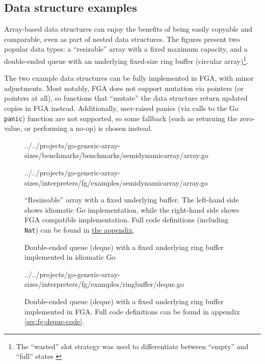 \subsection{Data structure examples}

Array-based data structures can enjoy the benefits of being easily copyable and
comparable, even as part of nested data structures. The figures present two
popular data types: a ``resizable'' array with a fixed maximum capacity, and a
double-ended queue with an underlying fixed-size ring buffer (circular
array)\footnote{The ``wasted'' slot strategy was used to differentiate between
	``empty'' and ``full'' states \autocite{ringBuffer}}.

The two example data structures can be fully implemented in FGA, with minor
adjustments. Most notably, FGA does not support mutation via pointers (or
pointers at all), so functions that ``mutate'' the data structure return updated
copies in FGA instead. Additionally, user-raised panics (via calls to the Go
\texttt{panic}) function are not supported, so some fallback (such as
returning the zero-value, or performing a no-op) is chosen instead.

\begin{figure}
	\noindent\begin{minipage}[t]{.45\linewidth}
		
		{../../projects/go-generic-array-sizes/benchmarks/benchmarks/semidynamicarray/array.go}
	\end{minipage}
	\hfill
	\noindent\begin{minipage}[t]{.45\linewidth}
		
		{../../projects/go-generic-array-sizes/interpreters/fg/examples/semidynamicarray/array.go}
	\end{minipage}
	\caption{ ``Resizeable'' array with a fixed underlying buffer. The left-hand side
		shows idiomatic Go implementation, while the right-hand side shows FGA
		compatible implementation. Full code definitions (including
		\texttt{Nat}) can be found in \hyperref[sec:fg-resizable-array-code]{the
			appendix}.}
\end{figure}

\begin{figure}
	\caption{Double-ended queue (deque) with a fixed underlying ring buffer implemented in idiomatic Go}
\end{figure}

\begin{figure}
	
	{../../projects/go-generic-array-sizes/interpreters/fg/examples/ringbuffer/deque.go}
	\caption{Double-ended queue (deque) with a fixed underlying ring buffer
		implemented in FGA. Full code definitions can be
		found in appendix \ref{sec:fg-deque-code}.}
\end{figure}
